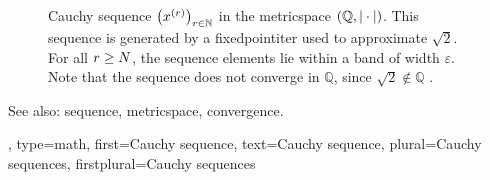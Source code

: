 {{\begin{figure}[H]
		\caption{Cauchy \gls{sequence} $\big(x^{(r)}\big)_{r\in\mathbb{N}}$ 
			in the \gls{metricspace} $\left( \mathbb{Q},|\cdot| \right)$. 
			This \gls{sequence} is generated by a \gls{fixedpointiter} used to approximate 
			$\sqrt{2}$. For all $r \ge N$, the \gls{sequence} elements lie within a band of width $\varepsilon$. 
			Note that the \gls{sequence} does not converge in $\mathbb{Q}$, 
			since $\sqrt{2} \notin \mathbb{Q}$ \cite[Example 1.1]{RudinBookPrinciplesMatheAnalysis}.\label{fig:fpit_cauchy_sqrt2_dict}}
		\end{figure}
		See also: \gls{sequence}, \gls{metricspace}, \gls{convergence}. }, 
	type=math,
	first={Cauchy sequence},
	text={Cauchy sequence},
	plural={Cauchy sequences},
	firstplural={Cauchy sequences}
}

